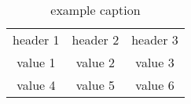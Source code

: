 \documentclass{article}
\begin{document}
\begin{table}[h!]
\centering
\begin{tabular}{c c c}
	header 1 & header 2 & header 3 \\
	value 1 & value 2 & value 3 \\
	value 4 & value 5 & value 6
\end{tabular}
\label{table: example}
\caption{example caption}
\end{table}
\end{document}
